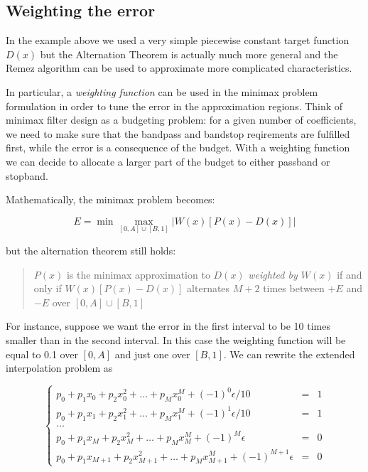 \documentclass[11pt]{article}
\begin{document}
    
    \subsection{Weighting the error}\label{weighting-the-error}

In the example above we used a very simple piecewise constant target
function \(D(x)\) but the Alternation Theorem is actually much more
general and the Remez algorithm can be used to approximate more
complicated characteristics.

In particular, a \emph{weighting function} can be used in the minimax
problem formulation in order to tune the error in the approximation
regions. Think of minimax filter design as a budgeting problem: for a
given number of coefficients, we need to make sure that the bandpass and
bandstop reqirements are fulfilled first, while the error is a
consequence of the budget. With a weighting function we can decide to
allocate a larger part of the budget to either passband or stopband.

Mathematically, the minimax problem becomes:

\[
    E = \min\max_{[0,A]\cup [B,1]} | W(x)[P(x) - D(x)] |
\]

but the alternation theorem still holds:

\begin{quote}
\(P(x)\) is the minimax approximation to \(D(x)\) \emph{weighted by
\(W(x)\)} if and only if \(W(x)[P(x) - D(x)]\) alternates \(M+2\) times
between \(+E\) and \(-E\) over \([0,A]\cup [B,1]\)
\end{quote}

For instance, suppose we want the error in the first interval to be 10
times smaller than in the second interval. In this case the weighting
function will be equal to 0.1 over \([0,A]\) and just one over
\([B,1]\). We can rewrite the extended interpolation problem as

\[
    \left\{\begin{array}{lcl}
        p_0 + p_1 x_0 + p_2 x_0^2 + \ldots + p_Mx_0^M + (-1)^0\epsilon/10 &=& 1 \\ 
        p_0 + p_1 x_1 + p_2 x_1^2 + \ldots + p_Mx_1^M + (-1)^1\epsilon/10 &=& 1 \\ 
        \ldots \\ 
        p_0 + p_1 x_{M} + p_2 x_{M}^2 + \ldots + p_Mx_{M}^M + (-1)^{M}\epsilon &=& 0\\ 
        p_0 + p_1 x_{M+1} + p_2 x_{M+1}^2 + \ldots + p_Mx_{M+1}^M + (-1)^{M+1}\epsilon &=& 0 
      \end{array}\right.
\]
\end{document}
